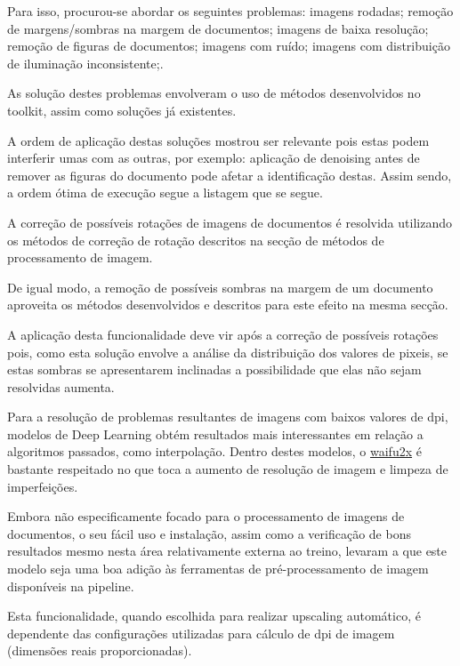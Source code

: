 Para isso, procurou-se abordar os seguintes problemas: imagens rodadas; remoção de margens/sombras na margem de documentos; imagens de baixa resolução; remoção de figuras de documentos; imagens com ruído; imagens com distribuição de iluminação inconsistente;.

As solução destes problemas envolveram o uso de métodos desenvolvidos no toolkit, assim como soluções já existentes.

A ordem de aplicação destas soluções mostrou ser relevante pois estas podem interferir umas com as outras, por exemplo: aplicação de denoising antes de remover as figuras do documento pode afetar a identificação destas. Assim sendo, a ordem ótima de execução segue a listagem que se segue.


A correção de possíveis rotações de imagens de documentos é resolvida utilizando os métodos de correção de rotação descritos na secção de métodos de processamento de imagem.


De igual modo, a remoção de possíveis sombras na margem de um documento aproveita os métodos desenvolvidos e descritos para este efeito na mesma secção. 

A aplicação desta funcionalidade deve vir após a correção de possíveis rotações pois, como esta solução envolve a análise da distribuição dos valores de pixeis, se estas sombras se apresentarem inclinadas a possibilidade que elas não sejam resolvidas aumenta.



Para a resolução de problemas resultantes de imagens com baixos valores de dpi, modelos de Deep Learning obtém resultados mais interessantes em relação a algoritmos passados, como interpolação. Dentro destes modelos, o \href{https://github.com/nagadomi/waifu2x}{waifu2x} é bastante respeitado no que toca a aumento de resolução de imagem e limpeza de imperfeições. 

Embora não especificamente focado para o processamento de imagens de documentos, o seu fácil uso e instalação, assim como a verificação de bons resultados mesmo nesta área relativamente externa ao treino, levaram a que este modelo seja uma boa adição às ferramentas de pré-processamento de imagem disponíveis na pipeline.

Esta funcionalidade, quando escolhida para realizar upscaling automático, é dependente das configurações utilizadas para cálculo de dpi de imagem (dimensões reais proporcionadas).

